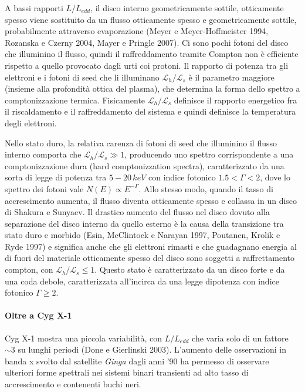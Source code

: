 \documentclass[a4paperbi]{article}
\begin{document}
	A bassi rapporti $L/L_{edd}$, il disco interno geometricamente sottile, otticamente spesso viene sostituito da un flusso otticamente spesso e geometricamente sottile, probabilmente attraverso evaporazione (Meyer e Meyer-Hoffmeister 1994, Rozanska e Czerny 2004, Mayer e Pringle 2007). Ci sono pochi fotoni del disco che illuminino il flusso, quindi il raffreddamento tramite Compton non è efficiente rispetto a quello provocato dagli urti coi protoni. Il rapporto di potenza tra gli elettroni e i fotoni di seed che li illuminano $\mathcal{L}_h/\mathcal{L}_s$ è il parametro maggiore (insieme alla profondità ottica del plasma), che determina la forma dello spettro a comptonizzazione termica. Fisicamente $\mathcal{L}_h/\mathcal{L}_s$ definisce il rapporto energetico fra il riscaldamento e il raffreddamento del sistema e quindi definisce la temperatura degli elettroni.
	
	Nello stato duro, la relativa carenza di fotoni di seed che illuminino il flusso interno comporta che $\mathcal{L}_h/\mathcal{L}_s\gg1$, producendo uno spettro corrispondente a una comptonizzazione dura (hard comptonizzation spectra), caratterizzato da una sorta di legge di potenza tra $5-20\,keV$ con indice fotonico $1.5<\Gamma<2$, dove lo spettro dei fotoni vale $N(E)\propto E^{-\Gamma}$. Allo stesso modo, quando il tasso di accrescimento aumenta, il flusso diventa otticamente spesso e collassa in un disco di Shakura e Sunyaev. Il drastico aumento del flusso nel disco dovuto alla separazione del disco interno da quello esterno è la causa della transizione tra stato duro e morbido (Esin, McClintock e Narayan 1997, Poutanen, Krolik e Ryde 1997) e significa anche che gli elettroni rimasti e che guadagnano energia al di fuori del materiale otticamente spesso del disco sono soggetti a raffrettamento compton, con $\mathcal{L}_h/\mathcal{L}_s\leq1$. Questo stato è caratterizzato da un disco forte e da una coda debole, caratterizzata all'incirca da una legge dipotenza con indice fotonico $\Gamma\geq2$.
	
\paragraph{Oltre a Cyg X-1}

	Cyg X-1 mostra una piccola variabilità, con $L/L_{edd}$ che varia solo di un fattore $\sim3$ su lunghi periodi (Done e Gierlinski 2003). L'aumento delle osservazioni in banda x svolto dal satellite \textit{Ginga} dagli anni '90 ha permesso di osservare ulteriori forme spettrali nei sistemi binari transienti ad alto tasso di accrescimento e contenenti buchi neri.
	
\end{document}

